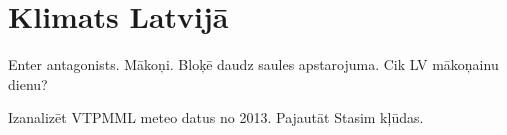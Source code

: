 \section{Klimats Latvijā}
Enter antagonists. Mākoņi. Bloķē daudz saules apstarojuma. Cik LV mākoņainu dienu?


Izanalizēt VTPMML meteo datus no 2013.
Pajautāt Stasim kļūdas.